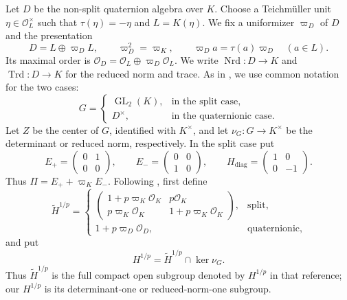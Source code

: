 \documentclass[11pt]{article}
\numberwithin{equation}{section}
\theoremstyle{definition}
\theoremstyle{remark}
\newcommand{\cO}{\mathcal O}
\DeclareMathOperator{\GL}{GL}
\DeclareMathOperator{\Nrd}{Nrd}
\DeclareMathOperator{\Trd}{Trd}
\begin{document}
Let $D$ be the non-split quaternion algebra over $K$. Choose a
Teichm\"uller unit $\eta\in\cO_L^{\times}$ such that
$\tau(\eta)=-\eta$ and $L=K(\eta)$. We fix a uniformizer
$\varpi_D$ of $D$ and the presentation
\begin{equation}\label{eq:quaternion-presentation}
 D=L\oplus\varpi_D L,\qquad \varpi_D^2=\varpi_K,\qquad
 \varpi_D a=\tau(a)\varpi_D\quad(a\in L).
\end{equation}
Its maximal order is $\cO_D=\cO_L\oplus\varpi_D\cO_L$.
We write $\Nrd:D\to K$ and $\Trd:D\to K$ for the reduced norm and trace.
As in \cite[\S~6.2]{Sor26b}, we use common notation for the two cases:
\[
 G=\begin{cases}
     \GL_2(K),&\text{in the split case},\\
     D^\times,&\text{in the quaternionic case}.
   \end{cases}
\]
Let $Z$ be the center of $G$, identified with $K^\times$, and let
$\nu_G:G\to K^\times$ be the determinant or reduced norm, respectively.
In the split case put
\[
 E_+=\begin{pmatrix}0&1\\0&0\end{pmatrix},\qquad
 E_-=\begin{pmatrix}0&0\\1&0\end{pmatrix},\qquad
 H_{\mathrm{diag}}=\begin{pmatrix}1&0\\0&-1\end{pmatrix}.
\]
Thus $\Pi=E_++\varpi_K E_-$.
Following \cite[\S~6.2]{Sor26b}, first define
\[
 \widetilde H^{1/p}=
 \begin{cases}
  \begin{pmatrix}
   1+p\varpi_K\cO_K&p\cO_K\\
   p\varpi_K\cO_K&1+p\varpi_K\cO_K
  \end{pmatrix},&\text{split},\\[6pt]
  1+p\varpi_D\cO_D,&\text{quaternionic},
 \end{cases}
\]
and put
\[
 H^{1/p}=\widetilde H^{1/p}\cap\ker\nu_G.
\]
Thus $\widetilde H^{1/p}$ is the full compact open subgroup denoted
by $H^{1/p}$ in that reference; our $H^{1/p}$ is its determinant-one
or reduced-norm-one subgroup.
\end{document}
